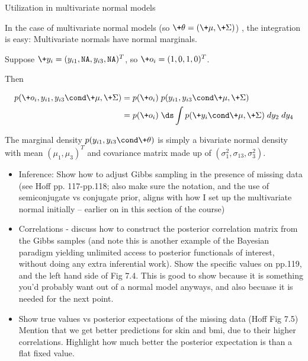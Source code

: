 \documentclass[10pt]{beamer}
\begin{document}
\begin{frame}{Utilization in multivariate normal models}


In the case of multivariate normal models \footnotesize (so $\+\theta = (\+\mu, \+\Sigma)$) \normalsize, the integration is easy:  Multivariate normals have normal marginals. 

\vfill \vfill \vfill 
\begin{example}
Suppose $\+y_i = (y_{i1},  \texttt{NA},  y_{i3},  \texttt{NA})^T$, so $\+o_i = (1,0,1,0)^T$.     

Then

\begin{align*}
p(\+o_i,  y_{i1},  y_{i3} \cond \+\mu, \+\Sigma) & = p(\+o_i) \;  p(y_{i1},  y_{i3} \cond \+\mu, \+\Sigma) \\
&=  p(\+o_i) \;  \ds\int p( \+y_i  \cond \+\mu, \+\Sigma)  \; dy_2 \; dy_4
\end{align*}
\vfill 

The marginal density $p(y_{i1},  y_{i3} \cond \+\theta)$ is simply a bivariate normal density with mean $(\mu_1,  \mu_3)^T$ and covariance matrix made up of $(\sigma^2_1,  \sigma_{13},  \sigma^2_3)$.
\end{example}

\end{frame}

\begin{frame}{}

\begin{itemize}
\item Inference: Show how to adjust Gibbs sampling in the presence of missing data (see Hoff pp. 117-pp.118;  also make sure the notation,  and the use of semiconjugate vs conjugate prior,  aligns with how I set up the multivariate normal initially -- earlier on in this section of the course)
\item Correlations - discuss how to construct the posterior correlation matrix from the Gibbs samples (and note this is another example of the Bayesian paradigm yielding unlimited access to posterior functionals of interest,  without doing any extra inferential work).    Show the specific values on pp.119,  and the left hand side of Fig 7.4.   This is good to show because it is something you'd probably want out of a normal model anyways,  and also becuase it is needed for the next point.
\item Show true values vs posterior expectations of the missing data (Hoff Fig 7.5)   Mention that we get better predictions for skin and bmi,  due to their higher correlations.  Highlight how much better the posterior expectation is than a flat fixed value.
\end{itemize}

\end{frame}
\end{document}
